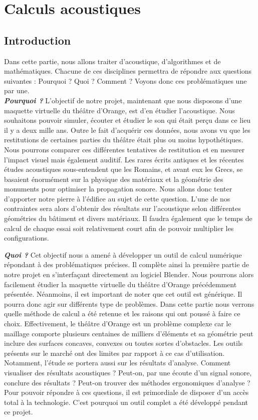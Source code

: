 \part{Calculs acoustiques}
	\chapter*{Introduction}
Dans cette partie, nous allons traiter d'acoustique, d'algorithmes et de mathématiques. Chacune de ces disciplines permettra de répondre aux questions suivantes : Pourquoi ? Quoi ? Comment ? Voyons donc ces problématiques une par une.\\

\textit{\textbf{Pourquoi ?}} L'objectif de notre projet, maintenant que nous disposons d'une maquette virtuelle du théâtre d'Orange, est d'en étudier l'acoustique. Nous souhaitons pouvoir simuler, écouter et étudier le son qui était perçu dans ce lieu il y a deux mille ans. Outre le fait d'acquérir ces données, nous avons vu que les restitutions de certaines parties du théâtre était plus ou moins hypothétiques. Nous pourrons comparer ces différentes tentatives de restitution et en mesurer l'impact visuel mais également auditif. Les rares écrits antiques et les récentes études acoustiques sous-entendent que les Romains, et avant eux les Grecs, se basaient énormément sur la physique des matériaux et la géométrie des monuments pour optimiser la propagation sonore. Nous allons donc tenter d'apporter notre pierre à l'édifice au sujet de cette question. L'une de nos contraintes sera alors d'obtenir des résultats sur l'acoustique selon différentes géométries du bâtiment et divers matériaux. Il faudra également que le temps de calcul de chaque essai soit relativement court afin de pouvoir multiplier les configurations.

\textit{\textbf{Quoi ?}} Cet objectif nous a amené à développer un outil de calcul numérique répondant à des problématiques précises. Il complète ainsi la première partie de notre projet en s'interfaçant directement au logiciel Blender. Nous pourrons alors facilement étudier la maquette virtuelle du théâtre d'Orange précédemment présentée. Néanmoins, il est important de noter que cet outil est générique. Il pourra donc agir sur différents type de problèmes. Dans cette partie nous verrons quelle méthode de calcul a été retenue et les raisons qui ont poussé à faire ce choix. Effectivement, le théâtre d'Orange est un problème complexe car le maillage comporte plusieurs centaines de milliers d'éléments et sa géométrie peut inclure des surfaces concaves, convexes ou toutes sortes d'obstacles. Les outils présents sur le marché ont des limites par rapport à ce cas d'utilisation. Notamment, l'étude se portera aussi sur les résultats d'analyse. Comment visualiser des résultats acoustiques ? Peut-on, par une écoute d'un signal sonore, conclure des résultats ? Peut-on trouver des méthodes ergonomiques d'analyse ? Pour pouvoir répondre à ces questions, il est primordiale de disposer d'un accès total à la technologie. C'est pourquoi un outil complet a été développé pendant ce projet.

